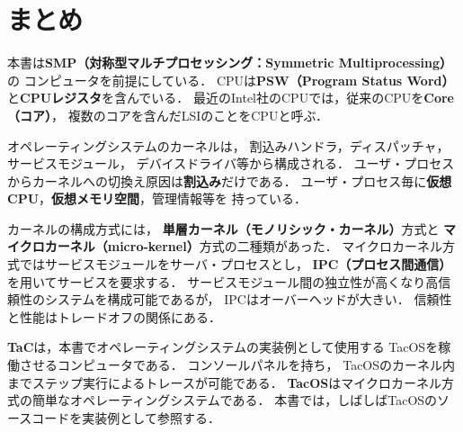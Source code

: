\section{まとめ}
本書は{\bf SMP（対称型マルチプロセッシング：Symmetric Multiprocessing）}の
コンピュータを前提にしている．
CPUは{\bf PSW（Program Status Word）}と{\bf CPUレジスタ}を含んでいる．
最近のIntel社のCPUでは，従来のCPUを{\bf Core（コア）}，
複数のコアを含んだLSIのことをCPUと呼ぶ．

オペレーティングシステムのカーネルは，
割込みハンドラ，ディスパッチャ，サービスモジュール，
デバイスドライバ等から構成される．
ユーザ・プロセスからカーネルへの切換え原因は{\bf 割込み}だけである．
ユーザ・プロセス毎に{\bf 仮想CPU}，{\bf 仮想メモリ空間}，管理情報等を
持っている．

カーネルの構成方式には，
{\bf 単層カーネル（モノリシック・カーネル）}方式と
{\bf マイクロカーネル（micro-kernel）}方式の二種類があった．
マイクロカーネル方式ではサービスモジュールをサーバ・プロセスとし，
{\bf IPC（プロセス間通信）}を用いてサービスを要求する．
サービスモジュール間の独立性が高くなり高信頼性のシステムを構成可能であるが，
IPCはオーバーヘッドが大きい．
信頼性と性能はトレードオフの関係にある．

{\bf TaC}は，本書でオペレーティングシステムの実装例として使用する
TacOSを稼働させるコンピュータである．
コンソールパネルを持ち，
TacOSのカーネル内までステップ実行によるトレースが可能である．
{\bf TacOS}はマイクロカーネル方式の簡単なオペレーティングシステムである．
本書では，しばしばTacOSのソースコードを実装例として参照する．




